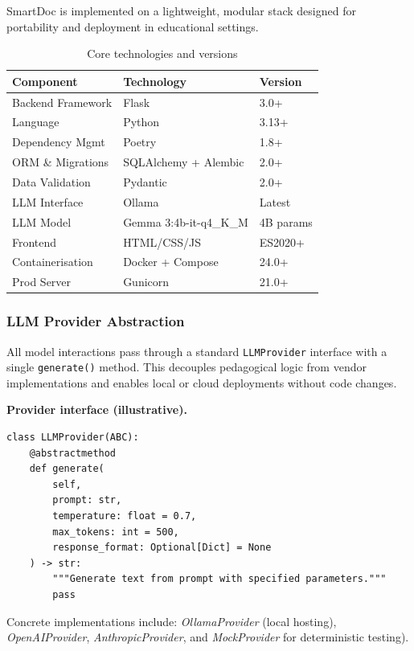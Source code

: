 SmartDoc is implemented on a lightweight, modular stack designed for portability and
deployment in educational settings.

\begin{table}[h]
\centering
\caption{Core technologies and versions}
\label{tab:core_stack}
\setlength{\tabcolsep}{6pt}
\renewcommand{\arraystretch}{1.12}
\begin{tabular}{p{3.2cm} p{4.0cm} p{2.0cm}}
\toprule
\textbf{Component} & \textbf{Technology} & \textbf{Version} \\
\midrule
Backend Framework & Flask & 3.0+  \\
Language & Python & 3.13+  \\
Dependency Mgmt & Poetry & 1.8+  \\
ORM \& Migrations & SQLAlchemy + Alembic & 2.0+ \\
Data Validation & Pydantic & 2.0+ \\
LLM Interface & Ollama & Latest  \\
LLM Model & Gemma 3:4b-it-q4\_K\_M & 4B params  \\
Frontend & HTML/CSS/JS & ES2020+  \\
Containerisation & Docker + Compose & 24.0+  \\
Prod Server & Gunicorn & 21.0+  \\
\bottomrule
\end{tabular}
\end{table}

\subsubsection{LLM Provider Abstraction}

All model interactions pass through a standard \texttt{LLMProvider} interface with a
single \texttt{generate()} method. This decouples pedagogical logic from vendor
implementations and enables local or cloud deployments without code changes.

\noindent\textbf{Provider interface (illustrative).}
\begin{verbatim}
class LLMProvider(ABC):
    @abstractmethod
    def generate(
        self,
        prompt: str,
        temperature: float = 0.7,
        max_tokens: int = 500,
        response_format: Optional[Dict] = None
    ) -> str:
        """Generate text from prompt with specified parameters."""
        pass
\end{verbatim}

Concrete implementations include: \textit{OllamaProvider} (local hosting), \textit{OpenAIProvider},
\textit{AnthropicProvider}, and \textit{MockProvider} for deterministic testing).

